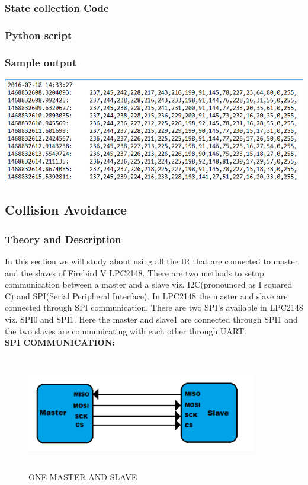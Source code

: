 \documentclass[11pt,a4paper]{book}
\begin{document}
	\subsubsection{State collection Code}
	
	\newpage 
	\subsubsection{Python script}
	
	
	\subsubsection{Sample output}
	\includegraphics[width=14cm]{serialcomm}
	
	\subsection{Collision Avoidance}
	\subsubsection{Theory and Description}
	In this section we will study about using all the IR that are connected to master and the slaves of Firebird V LPC2148. There are two methods to setup communication between a master and a slave viz. I2C(pronounced as I squared C) and SPI(Serial Peripheral Interface). In LPC2148 the master and slave are connected through SPI communication. There are two SPI's available in LPC2148 viz. SPI0 and SPI1. Here the master and slave1 are connected through SPI1 and the two slaves are communicating with each other through UART.\\
	\newline
	\textbf{SPI COMMUNICATION:}\\
	\begin{figure}[h]
		\centering
		\includegraphics[width=10cm,height=5cm]{SPI.PNG}
		\caption{ONE MASTER AND SLAVE}
	\end{figure}
	
\end{document}
